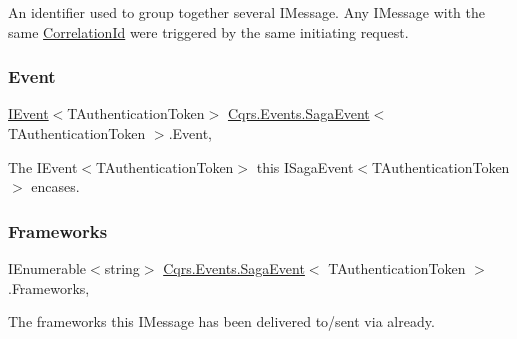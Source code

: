 An identifier used to group together several I\+Message. Any I\+Message with the same \hyperlink{classCqrs_1_1Events_1_1SagaEvent_a3bd1014469c88b763173da28a7d5023c_a3bd1014469c88b763173da28a7d5023c}{Correlation\+Id} were triggered by the same initiating request. 

\mbox{\label{classCqrs_1_1Events_1_1SagaEvent_ad965f37f2c485f04978237f0d1be9cb7_ad965f37f2c485f04978237f0d1be9cb7}} 
\subsubsection{\texorpdfstring{Event}{Event}}
{\footnotesize\ttfamily \hyperlink{interfaceCqrs_1_1Events_1_1IEvent}{I\+Event}$<$T\+Authentication\+Token$>$ \hyperlink{classCqrs_1_1Events_1_1SagaEvent}{Cqrs.\+Events.\+Saga\+Event}$<$ T\+Authentication\+Token $>$.Event\hspace{0.3cm}{\ttfamily [get]}, {\ttfamily [set]}}



The I\+Event$<$\+T\+Authentication\+Token$>$ this I\+Saga\+Event$<$\+T\+Authentication\+Token$>$ encases. 

\mbox{\label{classCqrs_1_1Events_1_1SagaEvent_a2a52816a942f9d69a3bec20f632b853d_a2a52816a942f9d69a3bec20f632b853d}} 
\subsubsection{\texorpdfstring{Frameworks}{Frameworks}}
{\footnotesize\ttfamily I\+Enumerable$<$string$>$ \hyperlink{classCqrs_1_1Events_1_1SagaEvent}{Cqrs.\+Events.\+Saga\+Event}$<$ T\+Authentication\+Token $>$.Frameworks\hspace{0.3cm}{\ttfamily [get]}, {\ttfamily [set]}}



The frameworks this I\+Message has been delivered to/sent via already. 

\mbox{\label{classCqrs_1_1Events_1_1SagaEvent_a995f70a4311341459b96bd00488f0eea_a995f70a4311341459b96bd00488f0eea}} 

